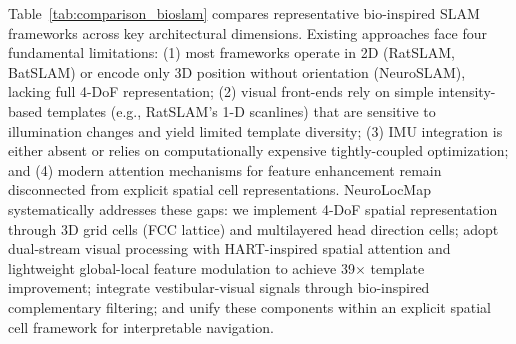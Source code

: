 Table~\ref{tab:comparison_bioslam} compares representative bio-inspired SLAM frameworks across key architectural dimensions. Existing approaches face four fundamental limitations: (1) most frameworks operate in 2D (RatSLAM, BatSLAM) or encode only 3D position without orientation (NeuroSLAM), lacking full 4-DoF representation; (2) visual front-ends rely on simple intensity-based templates (e.g., RatSLAM's 1-D scanlines) that are sensitive to illumination changes and yield limited template diversity; (3) IMU integration is either absent or relies on computationally expensive tightly-coupled optimization; and (4) modern attention mechanisms for feature enhancement remain disconnected from explicit spatial cell representations. NeuroLocMap systematically addresses these gaps: we implement 4-DoF spatial representation through 3D grid cells (FCC lattice) and multilayered head direction cells; adopt dual-stream visual processing with HART-inspired spatial attention and lightweight global-local feature modulation to achieve 39$\times$ template improvement; integrate vestibular-visual signals through bio-inspired complementary filtering; and unify these components within an explicit spatial cell framework for interpretable navigation.


